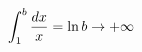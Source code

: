 \documentclass[preview]{standalone}
\begin{document}
\begin{align*}
\special{dvisvgm:raw <g id='unique000'>}\displaystyle\int_1^b\dfrac{dx}{x}=\ln b\to+\infty\special{dvisvgm:raw </g>}
\end{align*}
\end{document}
